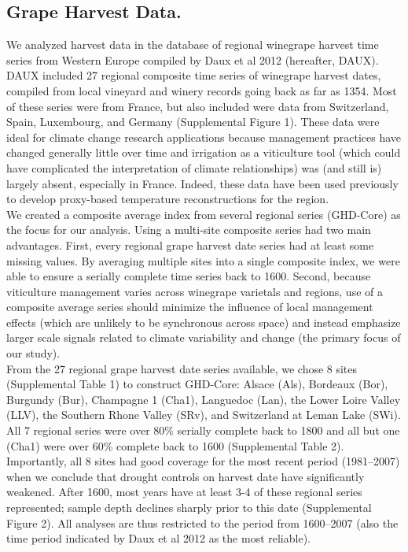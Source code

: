 \documentclass[final]{nature}
\begin{document}
\begin{methods}
\subsection{Grape Harvest Data.}
\noindent We analyzed harvest data in the database of regional winegrape harvest time series from Western Europe compiled by Daux et al 2012 (hereafter, DAUX\cite{Daux2012}). DAUX included 27 regional composite time series of winegrape harvest dates, compiled from local vineyard and winery records going back as far as 1354. Most of these series were from France, but also included were data from Switzerland, Spain, Luxembourg, and Germany (Supplemental Figure 1). These data were ideal for climate change research applications because management practices have changed generally little over time and irrigation as a viticulture tool (which could have complicated the interpretation of climate relationships) was (and still is) largely absent, especially in France. Indeed, these data have been used previously to develop proxy-based temperature reconstructions for the region\cite{Daux2012}.\\
\indent We created a composite average index from several regional series (GHD-Core) as the focus for our analysis. Using a multi-site composite series had two main advantages. First, every regional grape harvest date series had at least some missing values. By averaging multiple sites into a single composite index, we were able to ensure a serially complete time series back to 1600. Second, because viticulture management varies across winegrape varietals and regions, use of a composite average series should minimize the influence of local management effects (which are unlikely to be synchronous across space) and instead emphasize larger scale signals related to climate variability and change (the primary focus of our study).\\
\indent From the 27 regional grape harvest date series available, we chose 8 sites (Supplemental Table 1) to construct GHD-Core: Alsace (Als), Bordeaux (Bor), Burgundy (Bur), Champagne 1 (Cha1), Languedoc (Lan), the Lower Loire Valley (LLV), the Southern Rhone Valley (SRv), and Switzerland at Leman Lake (SWi). All 7 regional series were over $80\%$ serially complete back to 1800 and all but one (Cha1) were over $60\%$ complete back to 1600 (Supplemental Table 2). Importantly, all 8 sites had good coverage for the most recent period (1981--2007) when we conclude that drought controls on harvest date have significantly weakened. After 1600, most years have at least 3-4 of these regional series represented; sample depth declines sharply prior to this date (Supplemental Figure 2). All analyses are thus restricted to the period from 1600--2007 (also the time period indicated by Daux et al 2012 as the most reliable).\\

\end{methods}
\end{document}
